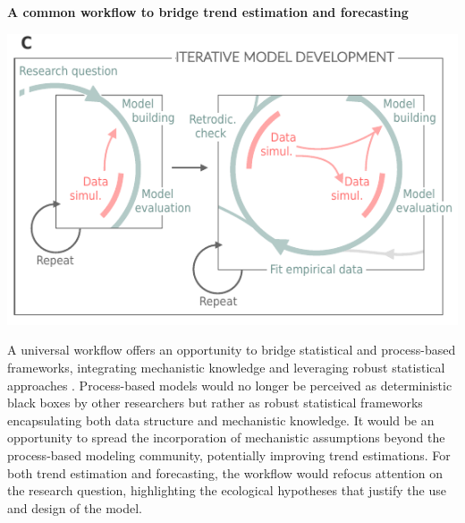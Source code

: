 \documentclass[11pt]{article}
\begin{document}
\begin{tcolorbox}
\centerline{\bf A common workflow to bridge trend estimation and forecasting} %
\vspace*{-3mm}
{\begin{multicols}{2}
\begin{minipage}[t]{\linewidth}
	\vfill
\includegraphics[width=\linewidth]{figures/iterativeworkflow_details}
\vfill
\vspace*{3mm}
\end{minipage}

\columnbreak
\vspace*{1mm}
A universal workflow offers an opportunity to bridge statistical and process-based frameworks, integrating mechanistic knowledge and leveraging robust statistical approaches \citep[e.g.][]{rounce2020quantifying}. Process-based models would no longer be perceived as deterministic black boxes by other researchers but rather as robust statistical frameworks encapsulating both data structure and mechanistic knowledge. It would be an opportunity to spread the incorporation of mechanistic assumptions beyond the process-based modeling community, potentially improving trend estimations. For both trend estimation and forecasting, the workflow would refocus attention on the research question, highlighting the ecological hypotheses that justify the use and design of the model.

\end{multicols}}

\end{tcolorbox}
\end{document}
